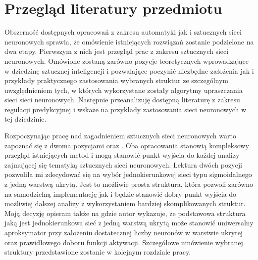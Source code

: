 \newpage %
\section{Przegląd literatury przedmiotu}
Obszerność dostępnych opracowań z zakresu automatyki jak i sztucznych sieci neuronowych sprawia, że omówienie istniejących rozwiązań zostanie podzielone na dwa etapy. Pierwszym z nich jest przegląd prac z zakresu sztucznych sieci neuronowych. Omówione zostaną zarówno pozycje teoretycznych wprowadzające w dziedzinę sztucznej inteligencji i pozwalające poczynić niezbędne założenia jak i przykłady praktycznego zastosowania wybranych struktur ze szczególnym uwzględnieniem tych, w których wykorzystane zostały algorytmy upraszczania sieci sieci neuronowych. Następnie przeanalizuję dostępną literaturę z zakresu regulacji predykcyjnej i wskaże na przykłady zastosowania sieci neuronowych w tej dziedzinie.

\par Rozpoczynając pracę nad zagadnieniem sztucznych sieci neuronowych warto zapoznać się z dwoma pozycjami \cite{haykin1999} oraz \cite{osowski2013}. Oba opracowania stanowią kompleksowy przegląd istniejących metod i mogą stanowić punkt wyjścia do każdej analizy zajmującej się tematyką sztucznych sieci neuronowych. Lektura dwóch pozycji pozwoliła mi zdecydować się na wybór jednokierunkowej sieci typu sigmoidalnego z jedną warstwą ukrytą. Jest to możliwie prosta struktura, która pozwoli zarówno na samodzielną implementację jak i będzie stanowić dobry punkt wyjścia do możliwiej dalszej analizy z wykorzystaniem bardziej skomplikowanych struktur. Moją decyzję opieram także na \cite{hornik1991} gdzie autor wykazuje, że podstawowa struktura jaką jest jednokierunkowa sieć z jedną warstwą ukrytą może stanowić uniwersalny aproksymator przy założeniu dostatecznej liczby neuronów w warstwie ukrytej oraz prawidłowego doboru funkcji aktywacji. Szczegółowe umówienie wybranej struktury przedstawione zostanie w kolejnym rozdziale pracy. 

